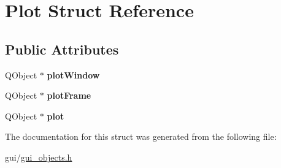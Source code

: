 \hypertarget{struct_plot}{}\section{Plot Struct Reference}
\label{struct_plot}
\subsection*{Public Attributes}
\begin{DoxyCompactItemize}
\item 
\mbox{\label{struct_plot_aef96b91eab77fc58e9d337c97bf16d0b}} 
Q\+Object $\ast$ {\bfseries plot\+Window}
\item 
\mbox{\label{struct_plot_a22a2aea9b9cf01dcfeaf43deda9cc6e3}} 
Q\+Object $\ast$ {\bfseries plot\+Frame}
\item 
\mbox{\label{struct_plot_a9c90096944ddbb2cfeddd9cf17f6d483}} 
Q\+Object $\ast$ {\bfseries plot}
\end{DoxyCompactItemize}


The documentation for this struct was generated from the following file\+:\begin{DoxyCompactItemize}
\item 
gui/\hyperlink{gui__objects_8h}{gui\+\_\+objects.\+h}\end{DoxyCompactItemize}
